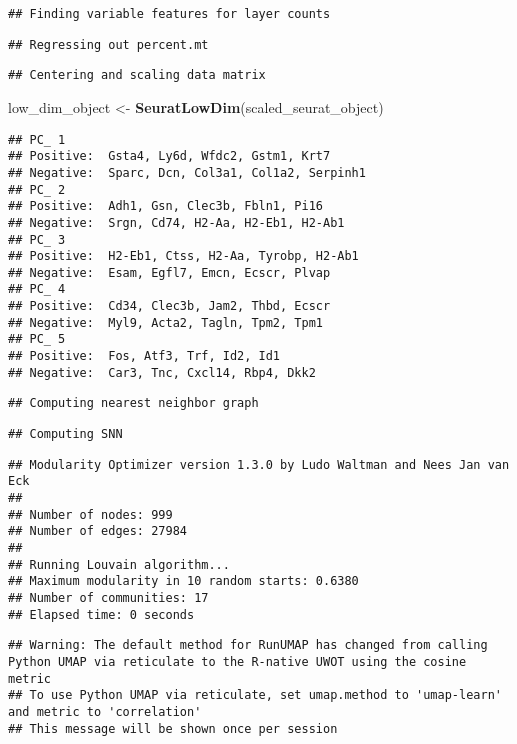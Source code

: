 \documentclass[
]{article}
\newenvironment{Shaded}{\begin{snugshade}}{\end{snugshade}}
\newcommand{\FunctionTok}[1]{\textcolor[rgb]{0.13,0.29,0.53}{\textbf{#1}}}
\newcommand{\NormalTok}[1]{#1}
\newcommand{\OtherTok}[1]{\textcolor[rgb]{0.56,0.35,0.01}{#1}}
\begin{document}
\begin{verbatim}
## Finding variable features for layer counts
\end{verbatim}

\begin{verbatim}
## Regressing out percent.mt
\end{verbatim}

\begin{verbatim}
## Centering and scaling data matrix
\end{verbatim}

\begin{Shaded}
\begin{Highlighting}[]
\NormalTok{low\_dim\_object }\OtherTok{\textless{}{-}} \FunctionTok{SeuratLowDim}\NormalTok{(scaled\_seurat\_object)}
\end{Highlighting}
\end{Shaded}

\begin{verbatim}
## PC_ 1 
## Positive:  Gsta4, Ly6d, Wfdc2, Gstm1, Krt7 
## Negative:  Sparc, Dcn, Col3a1, Col1a2, Serpinh1 
## PC_ 2 
## Positive:  Adh1, Gsn, Clec3b, Fbln1, Pi16 
## Negative:  Srgn, Cd74, H2-Aa, H2-Eb1, H2-Ab1 
## PC_ 3 
## Positive:  H2-Eb1, Ctss, H2-Aa, Tyrobp, H2-Ab1 
## Negative:  Esam, Egfl7, Emcn, Ecscr, Plvap 
## PC_ 4 
## Positive:  Cd34, Clec3b, Jam2, Thbd, Ecscr 
## Negative:  Myl9, Acta2, Tagln, Tpm2, Tpm1 
## PC_ 5 
## Positive:  Fos, Atf3, Trf, Id2, Id1 
## Negative:  Car3, Tnc, Cxcl14, Rbp4, Dkk2
\end{verbatim}

\begin{verbatim}
## Computing nearest neighbor graph
\end{verbatim}

\begin{verbatim}
## Computing SNN
\end{verbatim}

\begin{verbatim}
## Modularity Optimizer version 1.3.0 by Ludo Waltman and Nees Jan van Eck
## 
## Number of nodes: 999
## Number of edges: 27984
## 
## Running Louvain algorithm...
## Maximum modularity in 10 random starts: 0.6380
## Number of communities: 17
## Elapsed time: 0 seconds
\end{verbatim}

\begin{verbatim}
## Warning: The default method for RunUMAP has changed from calling Python UMAP via reticulate to the R-native UWOT using the cosine metric
## To use Python UMAP via reticulate, set umap.method to 'umap-learn' and metric to 'correlation'
## This message will be shown once per session
\end{verbatim}
\end{document}
